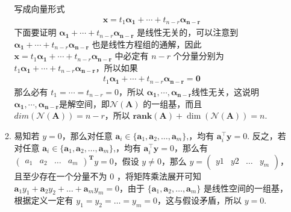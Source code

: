 \documentclass[11pt,letter,notitlepage]{article}
\newcommand{\rank}[1]{ \textbf{rank}  (#1)  }
\begin{document}
\begin{solution}
\begin{enumerate}
\begin{enumerate}
			写成向量形式
			\begin{align*}
				\mathbf{x} = t_{1} \mathbf{\alpha_{1}}+\cdots+t_{n-r} \mathbf{ \alpha_{n-r}}
			\end{align*}	
			下面要证明 $\mathbf{\alpha_{1}}+\cdots+t_{n-r} \mathbf{ \alpha_{n-r}}$ 是线性无关的，可以注意到 $\mathbf{\alpha_{1}}+\cdots+t_{n-r} \mathbf{ \alpha_{n-r}}$ 也是线性方程组的通解，因此 $\mathbf{x} = t_{1} \mathbf{\alpha_{1}}+\cdots+t_{n-r} \mathbf{ \alpha_{n-r}}$ 中必定有 $ n - r$ 个分量分别为 $ t_{1} \mathbf{\alpha_{1}}+\cdots+t_{n-r} \mathbf{ \alpha_{n-r}}$，所以如果
			\begin{align*}
				t_{1} \mathbf{\alpha_{1}}+\cdots+t_{n-r} \mathbf{ \alpha_{n-r}} = \mathbf{0}
			\end{align*}
			那么必有 $t_{1} = \cdots = t_{n-r} = 0$，所以 $ \mathbf{\alpha_{1}} , \cdots , \mathbf{ \alpha_{n-r}} $线性无关，这说明$ \mathbf{\alpha_{1}} , \cdots , \mathbf{ \alpha_{n-r}} $是解空间，即$\mathcal{N}(\mathbf{A})$ 的一组基，而且 $ dim(\mathcal{N}(\mathbf{A})) = n - r$，所以 $\rank{\mathbf{A}} + \dim(\mathcal{N}(\mathbf{A} ) ) = n$.
			\item 易知若 $ y = 0 $，那么对任意 $\mathbf{a}_i \in \{\mathbf{a}_1,\mathbf{a}_2,\ldots,\mathbf{a}_m\}$,，均有 $\mathbf{a}_i^{\top}\mathbf{y} = 0$. 反之，若对任意 $\mathbf{a}_i \in \{\mathbf{a}_1,\mathbf{a}_2,\ldots,\mathbf{a}_m\}$,，均有 $\mathbf{a}_i^{\top}\mathbf{y} = 0$，那么有 $\begin{pmatrix}
				a_1 & a_2 & \dots & a_m
			\end{pmatrix}^{\mathbf{T}} y = 0 $，假设 $ y \neq 0$，那么 $y = \begin{pmatrix}
				y1 & y2 & \dots & y_m
			\end{pmatrix}$，且至少存在一个分量不为 0 ，将矩阵乘法展开可知 $\mathbf{a}_1y_1 + \mathbf{a}_2y_2 + \dots + \mathbf{a}_my_m = 0$，由于 $\{\mathbf{a}_1,\mathbf{a}_2,\ldots,\mathbf{a}_m\}$ 是线性空间的一组基，根据定义一定有 $y_1 = y_2 = \dots = y_m = 0$，这与假设矛盾，所以 $ y = 0$.
		\end{enumerate}
	\end{enumerate}

\end{solution}

\newpage
\end{document}
